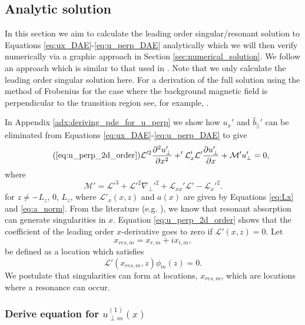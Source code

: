\documentclass[linenumbers]{aastex63}
\begin{document}
\subsection{Analytic solution}
\label{sec:analytic_soln}

In this section we aim to calculate the leading order singular/resonant solution to Equations \eqref{eq:ux_DAE}-\eqref{eq:u_perp_DAE} analytically which we will then verify numerically via a graphic approach in Section \ref{sec:numerical_solution}. We follow an approach which is similar to that used in \citet{Wright1996}. Note that we only calculate the leading order singular solution here. For a derivation of the full solution using the method of Frobenius for the case where the background magnetic field is perpendicular to the transition region see, for example, \citet{Thompson1993}.

In Appendix \ref{adx:deriving_pde_for_u_perp} we show how $u_x'$ and $\hat{b}_{||}'$ can be eliminated from Equations \eqref{eq:ux_DAE}-\eqref{eq:u_perp_DAE} to give
\begin{equation}
    \tag{\ref{eq:u_perp_2d_order}}
    \mathcal{L}'^2\pdv[2]{u_\perp'}{x}+'\mathcal{L}_x'\mathcal{L}'\pdv{u_\perp'}{x}+\mathcal{M}'u_\perp'=0,
\end{equation}
where
\begin{equation}
    \mathcal{M}' = \mathcal{L}'^3+\mathcal{L}'^2\nabla_\perp'^2+\mathcal{L}_{xx}'\mathcal{L}'-\mathcal{L}_x'^2.
\end{equation}
for $z\ne-L_z$, 0, $L_z$, where $\mathcal{L}'_x(x,z)$ and $a(x)$ are given by Equations \eqref{eq:Lx} and \eqref{eq:a_norm}. 
From the literature (e.g. \citealt{Thompson1993,Wright1996}), we know that resonant absorption can generate singularities in $x$. Equation \eqref{eq:u_perp_2d_order} shows that the coefficient of the leading order $x$-derivative goes to zero if $\mathcal{L}'(x,z)=0$. Let
\[x_{res,m} = x_{r,m} + i x_{i,m},\]
be defined as a location which satisfies
\begin{equation}
    \label{eq:x_res_defn}
    \mathcal{L}'(x_{res,m},z)\phi_m(z)=0.
\end{equation}
We postulate that singularities can form at locations, $x_{res,m}$, which are locations where a resonance can occur.

\subsubsection{Derive equation for \texorpdfstring{$u_{\perp m}^{(1)}(x)$}{uperpm(1)(x)}}
\end{document}
